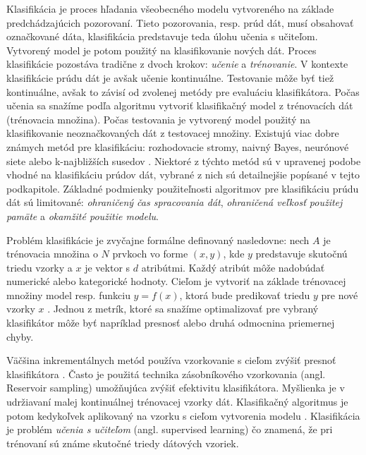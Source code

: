\par
Klasifikácia je proces hľadania všeobecného modelu vytvoreného na základe predchádzajúcich pozorovaní. Tieto pozorovania, resp. prúd dát, musí obsahovať označkované dáta, klasifikácia predstavuje teda úlohu učenia s učiteľom. Vytvorený model je potom použitý na klasifikovanie nových dát. Proces klasifikácie pozostáva tradične z dvoch krokov: \textit{učenie} a \textit{trénovanie}. V kontexte klasifikácie prúdu dát je avšak učenie kontinuálne. Testovanie môže byť tiež kontinuálne, avšak to závisí od zvolenej metódy pre evaluáciu klasifikátora. Počas učenia sa snažíme podľa algoritmu vytvoriť klasifikačný model z trénovacích dát (trénovacia množina). Počas testovania je vytvorený model použitý na klasifikovanie neoznačkovaných dát z testovacej množiny. Existujú viac dobre známych metód pre klasifikáciu: rozhodovacie stromy, naivný Bayes, neurónové siete alebo k-najbližších susedov \citep{nguyen2015survey}. Niektoré z týchto metód sú v upravenej podobe vhodné na klasifikáciu prúdov dát, vybrané z nich sú detailnejšie popísané v tejto podkapitole. Základné podmienky použiteľnosti algoritmov pre klasifikáciu prúdu dát sú limitované: \textit{ohraničený čas spracovania dát}, \textit{ohraničená veľkosť použitej pamäte} a \textit{okamžité použitie modelu}.
\par
Problém klasifikácie je zvyčajne formálne definovaný nasledovne: nech $A$ je trénovacia množina o $N$ prvkoch vo forme $(x,y)$, kde $y$ predstavuje skutočnú triedu vzorky a $x$ je vektor s $d$ atribútmi. Každý atribút môže nadobúdať numerické alebo kategorické hodnoty. Cieľom je vytvoriť na základe trénovacej množiny model resp. funkciu $y=f(x)$, ktorá bude predikovať triedu $y$ pre nové vzorky $x$ \citep{domingos2000mining}. Jednou z metrík, ktoré sa snažíme optimalizovať pre vybraný klasifikátor môže byť napríklad presnosť alebo druhá odmocnina priemernej chyby.
\par
Väčšina inkrementálnych metód používa vzorkovanie s cieľom zvýšiť presnoť klasifikátora \citep{aggarwal2014survey, nguyen2015survey}. Často je použitá technika zásobníkového vzorkovania (angl. Reservoir sampling) umožňujúca zvýšiť efektivitu klasifikátora. Myšlienka je v udržiavaní malej kontinuálnej trénovacej vzorky dát. Klasifikačný algoritmus je potom kedykoľvek aplikovaný na vzorku s cieľom vytvorenia modelu \citep{aggarwal2014survey}. Klasifikácia je problém \textit{učenia s učiteľom} (angl. supervised learning) čo znamená, že pri trénovaní sú známe skutočné triedy dátových vzoriek.

